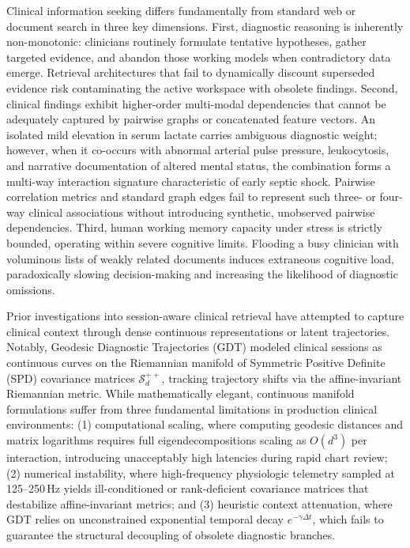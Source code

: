 \documentclass[12pt]{article}
\begin{document}
Clinical information seeking differs fundamentally from standard web or document search in three key dimensions. First, diagnostic reasoning is inherently non-monotonic: clinicians routinely formulate tentative hypotheses, gather targeted evidence, and abandon those working models when contradictory data emerge. Retrieval architectures that fail to dynamically discount superseded evidence risk contaminating the active workspace with obsolete findings. Second, clinical findings exhibit higher-order multi-modal dependencies that cannot be adequately captured by pairwise graphs or concatenated feature vectors. An isolated mild elevation in serum lactate carries ambiguous diagnostic weight; however, when it co-occurs with abnormal arterial pulse pressure, leukocytosis, and narrative documentation of altered mental status, the combination forms a multi-way interaction signature characteristic of early septic shock. Pairwise correlation metrics and standard graph edges fail to represent such three- or four-way clinical associations without introducing synthetic, unobserved pairwise dependencies\cite{feng2019hypergraph,zhou2006learning}. Third, human working memory capacity under stress is strictly bounded, operating within severe cognitive limits\cite{miller1956magical,sweller1988cognitive,sweller2019cognitive}. Flooding a busy clinician with voluminous lists of weakly related documents induces extraneous cognitive load, paradoxically slowing decision-making and increasing the likelihood of diagnostic omissions\cite{harry2018cognitive}.

Prior investigations into session-aware clinical retrieval have attempted to capture clinical context through dense continuous representations or latent trajectories. Notably, Geodesic Diagnostic Trajectories (GDT) modeled clinical sessions as continuous curves on the Riemannian manifold of Symmetric Positive Definite (SPD) covariance matrices $\mathcal{S}_d^{++}$, tracking trajectory shifts via the affine-invariant Riemannian metric\cite{huang2017riemannian,pennec2006riemannian,arsigny2007geometric,moakher2005differential}. While mathematically elegant, continuous manifold formulations suffer from three fundamental limitations in production clinical environments: (1) computational scaling, where computing geodesic distances and matrix logarithms requires full eigendecompositions scaling as $O(d^3)$ per interaction, introducing unacceptably high latencies during rapid chart review; (2) numerical instability, where high-frequency physiologic telemetry sampled at 125--250\,Hz yields ill-conditioned or rank-deficient covariance matrices that destabilize affine-invariant metrics; and (3) heuristic context attenuation, where GDT relies on unconstrained exponential temporal decay $e^{-\gamma \Delta t}$, which fails to guarantee the structural decoupling of obsolete diagnostic branches.
\end{document}
